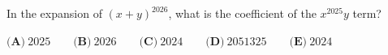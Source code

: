 In the expansion of $(x+y)^{2026}$, what is the coefficient of the $x^{2025}y$ term?

$\textbf{(A)}~2025\qquad\textbf{(B)}~2026\qquad\textbf{(C)}~2024\qquad\textbf{(D)}~2051325\qquad\textbf{(E)}~2024\qquad$
